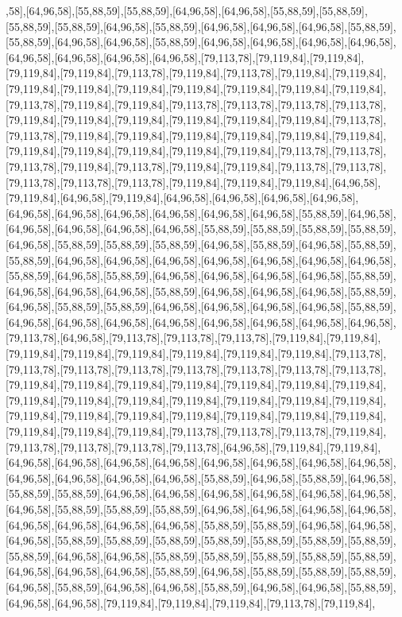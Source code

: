 ,58],[64,96,58],[55,88,59],[55,88,59],[64,96,58],[64,96,58],[55,88,59],[55,88,59],[55,88,59],[55,88,59],[64,96,58],[55,88,59],[64,96,58],[64,96,58],[64,96,58],[55,88,59],[55,88,59],[64,96,58],[64,96,58],[55,88,59],[64,96,58],[64,96,58],[64,96,58],[64,96,58],[64,96,58],[64,96,58],[64,96,58],[64,96,58],[79,113,78],[79,119,84],[79,119,84],[79,119,84],[79,119,84],[79,113,78],[79,119,84],[79,113,78],[79,119,84],[79,119,84],[79,119,84],[79,119,84],[79,119,84],[79,119,84],[79,119,84],[79,119,84],[79,119,84],[79,113,78],[79,119,84],[79,119,84],[79,113,78],[79,113,78],[79,113,78],[79,113,78],[79,119,84],[79,119,84],[79,119,84],[79,119,84],[79,119,84],[79,119,84],[79,113,78],[79,113,78],[79,119,84],[79,119,84],[79,119,84],[79,119,84],[79,119,84],[79,119,84],[79,119,84],[79,119,84],[79,119,84],[79,119,84],[79,119,84],[79,113,78],[79,113,78],[79,113,78],[79,119,84],[79,113,78],[79,119,84],[79,119,84],[79,113,78],[79,113,78],[79,113,78],[79,113,78],[79,113,78],[79,119,84],[79,119,84],[79,119,84],[64,96,58],[79,119,84],[64,96,58],[79,119,84],[64,96,58],[64,96,58],[64,96,58],[64,96,58],[64,96,58],[64,96,58],[64,96,58],[64,96,58],[64,96,58],[64,96,58],[55,88,59],[64,96,58],[64,96,58],[64,96,58],[64,96,58],[64,96,58],[55,88,59],[55,88,59],[55,88,59],[55,88,59],[64,96,58],[55,88,59],[55,88,59],[55,88,59],[64,96,58],[55,88,59],[64,96,58],[55,88,59],[55,88,59],[64,96,58],[64,96,58],[64,96,58],[64,96,58],[64,96,58],[64,96,58],[64,96,58],[55,88,59],[64,96,58],[55,88,59],[64,96,58],[64,96,58],[64,96,58],[64,96,58],[55,88,59],[64,96,58],[64,96,58],[64,96,58],[55,88,59],[64,96,58],[64,96,58],[64,96,58],[55,88,59],[64,96,58],[55,88,59],[55,88,59],[64,96,58],[64,96,58],[64,96,58],[64,96,58],[55,88,59],[64,96,58],[64,96,58],[64,96,58],[64,96,58],[64,96,58],[64,96,58],[64,96,58],[64,96,58],[79,113,78],[64,96,58],[79,113,78],[79,113,78],[79,113,78],[79,119,84],[79,119,84],[79,119,84],[79,119,84],[79,119,84],[79,119,84],[79,119,84],[79,119,84],[79,113,78],[79,113,78],[79,113,78],[79,113,78],[79,113,78],[79,113,78],[79,113,78],[79,113,78],[79,119,84],[79,119,84],[79,119,84],[79,119,84],[79,119,84],[79,119,84],[79,119,84],[79,119,84],[79,119,84],[79,119,84],[79,119,84],[79,119,84],[79,119,84],[79,119,84],[79,119,84],[79,119,84],[79,119,84],[79,119,84],[79,119,84],[79,119,84],[79,119,84],[79,119,84],[79,119,84],[79,119,84],[79,113,78],[79,113,78],[79,113,78],[79,119,84],[79,113,78],[79,113,78],[79,113,78],[79,113,78],[64,96,58],[79,119,84],[79,119,84],[64,96,58],[64,96,58],[64,96,58],[64,96,58],[64,96,58],[64,96,58],[64,96,58],[64,96,58],[64,96,58],[64,96,58],[64,96,58],[64,96,58],[55,88,59],[64,96,58],[55,88,59],[64,96,58],[55,88,59],[55,88,59],[64,96,58],[64,96,58],[64,96,58],[64,96,58],[64,96,58],[64,96,58],[64,96,58],[55,88,59],[55,88,59],[55,88,59],[64,96,58],[64,96,58],[64,96,58],[64,96,58],[64,96,58],[64,96,58],[64,96,58],[64,96,58],[55,88,59],[55,88,59],[64,96,58],[64,96,58],[64,96,58],[55,88,59],[55,88,59],[55,88,59],[55,88,59],[55,88,59],[55,88,59],[55,88,59],[55,88,59],[64,96,58],[64,96,58],[55,88,59],[55,88,59],[55,88,59],[55,88,59],[55,88,59],[64,96,58],[64,96,58],[64,96,58],[55,88,59],[64,96,58],[55,88,59],[55,88,59],[55,88,59],[64,96,58],[55,88,59],[64,96,58],[64,96,58],[55,88,59],[64,96,58],[64,96,58],[55,88,59],[64,96,58],[64,96,58],[79,119,84],[79,119,84],[79,119,84],[79,113,78],[79,119,84],